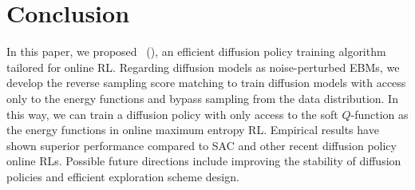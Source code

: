 \section{Conclusion}
In this paper, we proposed \algname~(\algabb), an efficient diffusion policy training algorithm tailored for online RL. Regarding diffusion models as noise-perturbed EBMs, we develop the reverse sampling score matching to train diffusion models with access only to the energy functions and bypass sampling from the data distribution. In this way, we can train a diffusion policy with only access to the soft $Q$-function as the energy functions in online maximum entropy RL. Empirical results have shown superior performance compared to SAC and other recent diffusion policy online RLs. Possible future directions include improving the stability of diffusion policies and efficient exploration scheme design.
